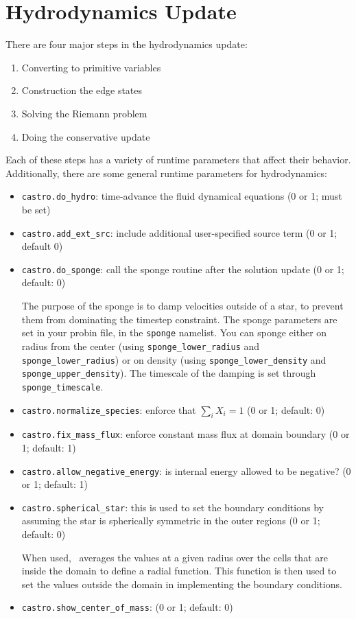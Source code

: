\section{Hydrodynamics Update}

\label{Sec:Advection Step}

There are four major steps in the hydrodynamics update:
\begin{enumerate}
\item Converting to primitive variables
\item Construction the edge states
\item Solving the Riemann problem
\item Doing the conservative update
\end{enumerate}
Each of these steps has a variety of runtime parameters that
affect their behavior.  Additionally, there are some general
runtime parameters for hydrodynamics:
\begin{itemize}
\item {\tt castro.do\_hydro}: time-advance the fluid dynamical
  equations (0 or 1; must be set)

\item {\tt castro.add\_ext\_src}: include additional user-specified
  source term (0 or 1; default 0)
  
\item {\tt castro.do\_sponge}: call the sponge routine
  after the solution update (0 or 1; default: 0)

  The purpose of the sponge is to damp velocities outside of a star, to
  prevent them from dominating the timestep constraint. The sponge parameters
  are set in your probin file, in the {\tt sponge} namelist. You can sponge either
  on radius from the center (using {\tt sponge\_lower\_radius} and
  {\tt sponge\_lower\_radius}) or on density (using {\tt sponge\_lower\_density}
  and {\tt sponge\_upper\_density}). The timescale of the damping is
  set through {\tt sponge\_timescale}.
  
\item {\tt castro.normalize\_species}: enforce that $\sum_i X_i = 1$
  (0 or 1; default: 0)
  
\item {\tt castro.fix\_mass\_flux}: enforce constant mass flux at
  domain boundary (0 or 1; default: 1)
  
\item {\tt castro.allow\_negative\_energy}: is internal energy allowed to be
  negative? (0 or 1; default: 1)
  
\item {\tt castro.spherical\_star}: this is used to set the boundary
  conditions by assuming the star is spherically symmetric in
  the outer regions (0 or 1; default: 0)

  When used, \castro\ averages the values at a given radius over the
  cells that are inside the domain to define a radial function.  This
  function is then used to set the values outside the domain in
  implementing the boundary conditions.
  
\item {\tt castro.show\_center\_of\_mass}: (0 or 1; default: 0)
\end{itemize}

